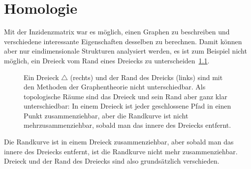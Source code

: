 %
%
%
\chapter{Homologie
\label{buch:chapter:homologie}}
\rhead{}
Mit der Inzidenzmatrix war es möglich, einen Graphen zu beschreiben
und verschiedene interessante Eigenschaften desselben zu berechnen.
Damit können aber nur eindimensionale Strukturen analysiert werden,
es ist zum Beispiel nicht möglich, ein Dreieck vom Rand eines
Dreiecks zu unterscheiden~\ref{buch:homologie:figure:zusammenziehbar}.
\begin{figure}
\centering
{}
\caption{Ein Dreieck $\triangle$ (rechts) und der Rand des Dreicks
(links) sind mit den Methoden
der Graphentheorie nicht unterschiedbar. 
Als topologische Räume sind das Dreieck und sein Rand aber ganz klar
unterschiedbar: In einem Dreieck ist jeder geschlossene Pfad in einen 
Punkt zusammenziehbar, aber die Randkurve ist nicht mehrzusammenziehbar,
sobald man das innere des Dreiecks entfernt.
\label{buch:homologie:figure:zusammenziehbar}}
\end{figure}
Die Randkurve ist in einem Dreieck zusammenziehbar, aber sobald man
das innere des Dreiecks entfernt, ist die Randkurve nicht mehr
zusammenziehbar.
Dreieck und der Rand des Dreiecks sind also grundsätzlich verschieden.

